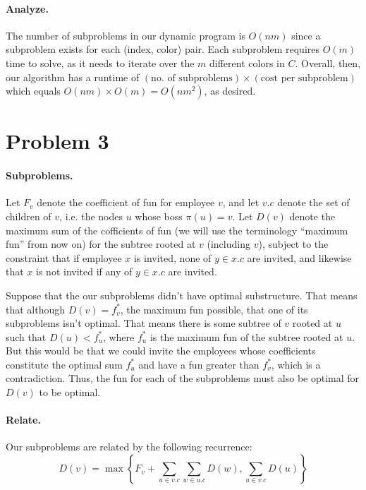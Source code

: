 \documentclass{6046}
\begin{document}
\vspace{-1em}
\paragraph{Analyze.}
The number of subproblems in our dynamic program
is $O(nm)$ since a subproblem exists for each
(index, color) pair. Each subproblem requires
$O(m)$ time to solve, as it needs to iterate over
the $m$ different colors in $C$. Overall, then,
our algorithm has a runtime of $(\text{no. of subproblems})
\times (\text{cost per subproblem})$ which equals $O(nm)
\times O(m) = O(nm^2)$, as desired.


\section*{Problem 3}
\paragraph{Subproblems.}
Let $F_v$ denote the coefficient of fun for employee $v$,
and let $v.c$ denote the set of children of $v$, i.e. the nodes
$u$ whose boss $\pi(u) = v$. Let $D(v)$ denote the 
maximum sum of the cofficients of fun (we
will use the terminology ``maximum fun'' from now on)
for the subtree
rooted at $v$ (including $v$), subject to the constraint
that if employee $x$ is invited, none of $y \in x.c$
are invited, and likewise that $x$ is not invited if
any of $y \in x.c$ are invited.

Suppose that the our subproblems didn't have optimal substructure.
That means that although $D(v) = f_v^*$, the maximum fun possible,
that one of its subproblems isn't optimal. That means there is
some subtree of $v$ rooted at $u$ such that $D(u) < f_{u}^*$,
where $f_u^*$ is the maximum fun of the subtree rooted at $u$.
But this would be that we could invite the employees whose
coefficients constitute the optimal sum $f_u^*$ and have
a fun greater than $f_v^*$, which is a contradiction. Thus,
the fun for each of the subproblems must also be optimal for $D(v)$
to be optimal.

\vspace{-1em}
\paragraph{Relate.}
Our subproblems are related by the following recurrence:
\[
    D(v) = \max
    \left\{
        F_v + \sum_{u \in v.c}\sum_{w \in u.c} D(w),
        \sum_{u \in v.c} D(u)
    \right\}
\]
\end{document}
